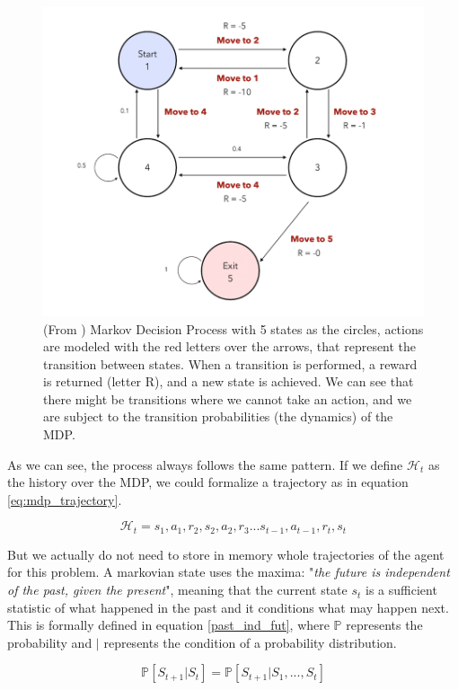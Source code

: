 \begin{figure}[!h]
	\centering
	\includegraphics[width=0.8\linewidth]{figures/mdp.png}
	\caption{ (From \cite{markovdecisionprocessgithub}) Markov Decision Process with 5 states as the circles, actions are modeled with the red letters over the arrows, that represent the transition between states. When a transition is performed, a reward is returned (letter R), and a new state is achieved. We can see that there might be transitions where we cannot take an action, and we are subject to the transition probabilities (the dynamics) of the MDP.}
	\label{fig:mdp}
\end{figure} 

As we can see, the process always follows the same pattern. If we define $\mathcal{H}_t$ as the history over the MDP, we could formalize a trajectory as in equation \ref{eq:mdp_trajectory}.

\begin{equation} \label{eq:mdp_trajectory}
	\mathcal{H}_t = s_1, a_1, r_2, s_2, a_2, r_3 ... s_{t-1}, a_{t-1}, r_t, s_t
\end{equation}

But we actually do not need to store in memory whole trajectories of the agent for this problem. A markovian state uses the maxima: "\textit{the future is independent of the past, given the present}", meaning that the current state $s_t$ is a sufficient statistic of what happened in the past and it conditions what may happen next. This is formally defined in equation \ref{past_ind_fut}, where $\mathbb{P}$ represents the probability and $|$ represents the condition of a probability distribution.

\begin{equation} \label{past_ind_fut}
	\mathbb{P}[S_{t+1} | S_t] = \mathbb{P}[S_{t+1} | S_1, ..., S_t]
\end{equation}

